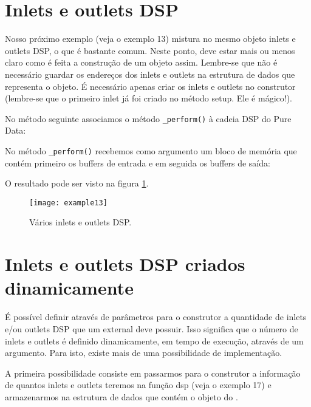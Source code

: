 \section{Inlets e outlets DSP}

Nosso próximo exemplo (veja o exemplo 13) mistura no mesmo objeto inlets e
outlets DSP, o que é bastante comum. Neste ponto, deve estar mais ou menos
claro como é feita a construção de um objeto assim. Lembre-se que não é
necessário guardar os endereços dos inlets e outlets na estrutura de dados que
representa o objeto. É necessário apenas criar os inlets e outlets no
construtor (lembre-se que o primeiro inlet já foi criado no método setup. Ele
é mágico!).



No método seguinte associamos o método \texttt{\_perform()} à cadeia DSP do
Pure Data:



No método \texttt{\_perform()} recebemos como argumento um bloco de memória
que contém primeiro os buffers de entrada e em seguida os buffers de saída:



O resultado pode ser visto na figura \ref{fig:varios-inlets-outlets}.

\begin{figure}[h!]
\centering
\texttt{[image: example13]}
\caption{Vários inlets e outlets DSP.}
\label{fig:varios-inlets-outlets}
\end{figure}

\section{Inlets e outlets DSP criados dinamicamente}

É possível definir através de parâmetros para o construtor a quantidade de
inlets e/ou outlets DSP que um external deve possuir. Isso significa que o
número de inlets e outlets é definido dinamicamente, em tempo de execução,
através de um argumento. Para isto, existe mais de uma possibilidade de
implementação.

A primeira possibilidade consiste em passarmos para o construtor a informação
de quantos inlets e outlets teremos na função dsp (veja o exemplo
17) e armazenarmos na estrutura de dados que contém o objeto do \external.

